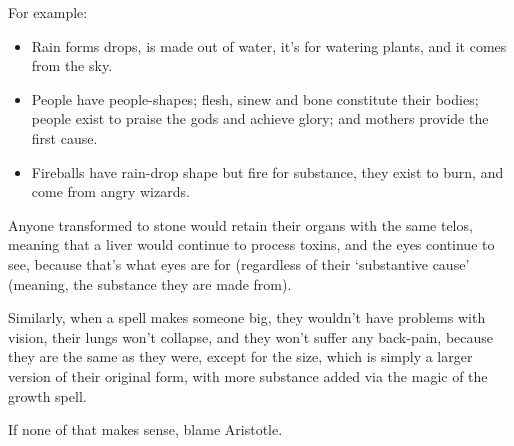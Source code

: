 \begin{multicols}{2}
\noindent
For example:

\begin{itemize}
  \item
  Rain forms drops, is made out of water, it's for watering plants, and it comes from the sky.
  \item
  People have people-shapes; flesh, sinew and bone constitute their bodies; people exist to praise the gods and achieve glory; and mothers provide the first cause.
  \item
  Fireballs have rain-drop shape but fire for substance, they exist to burn, and come from angry wizards.
\end{itemize}

Anyone transformed to stone would retain their organs with the same telos, meaning that a liver would continue to process toxins, and the eyes continue to see, because that's what eyes are for (regardless of their `substantive cause' (meaning, the substance they are made from).

Similarly, when a spell makes someone big, they wouldn't have problems with vision, their lungs won't collapse, and they won't suffer any back-pain, because they are the same as they were, except for the size, which is simply a larger version of their original form, with more substance added via the magic of the growth spell.

If none of that makes sense, blame Aristotle.

\end{multicols}
